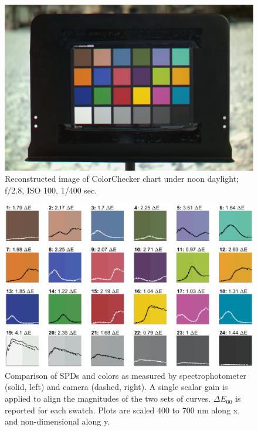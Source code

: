 \documentclass[twocolumn,10pt]{asme2ej}
\begin{document}
\clearpage

\onecolumn

\begin{figure}[H]
\begin{centering}
  \includegraphics[height=0.50\linewidth]{colorchecker.jpg}
  \caption{Reconstructed image of ColorChecker chart under noon daylight; f/2.8, ISO 100, 1/400 sec.}
  \label{colorchecker_mesh}
  \end{centering}
\end{figure}

\begin{figure}[H]
\begin{centering}
  \includegraphics[height=0.60\linewidth]{colorchecker_SPDs.eps}
    \caption{Comparison of SPDs and colors as measured by spectrophotometer (solid, left) and camera (dashed, right). A single scalar gain is applied to align the magnitudes of the two sets of curves. $\Delta E_{00}$ is reported for each swatch. Plots are scaled 400 to 700 nm along x, and non-dimensional along y.}
  \label{colorchecker_SPDs}
    \end{centering}
\end{figure}
\end{document}
